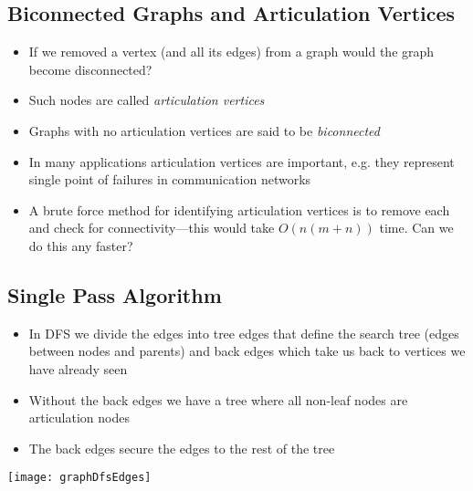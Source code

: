 \begin{slide}
\section{Biconnected Graphs and Articulation Vertices}

\begin{PauseHighLight}
  \begin{itemize}
  \item If we removed a vertex (and all its edges) from a graph would
    the graph become disconnected?\pause
  \item Such nodes are called \emph{articulation vertices}\pause
  \item Graphs with no articulation vertices are said to be
    \emph{biconnected}\pause
  \item In many applications articulation vertices are important,
    e.g. they represent single point of failures in communication
    networks\pause
  \item A brute force method for identifying articulation vertices is to
    remove each and check for connectivity---this would take $O(n(m+n))$
    time\pause. Can we do this any faster?\pauseb 
  \end{itemize}
\end{PauseHighLight}

\end{slide}


\begin{slide}
\section{Single Pass Algorithm}


\begin{minipage}{0.55\linewidth}
  \begin{PauseHighLight}
    \begin{itemize}
    \item In DFS we divide the edges into tree edges that define the
      search tree (edges between nodes and parents) and back edges
      which take us back to vertices we have already seen\pause
    \item Without the back edges we have a tree where all non-leaf nodes
      are articulation nodes\pause
    \item The back edges secure the edges to the rest of the tree\pause
    \end{itemize}
  \end{PauseHighLight}
\end{minipage}\hfill
\begin{minipage}{0.4\linewidth}
  \texttt{[image: graphDfsEdges]}
\end{minipage}

\end{slide}

